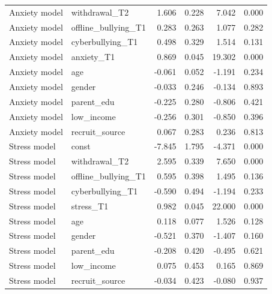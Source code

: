\begin{table}
\begin{tabular}{llrrrr}
Anxiety model & withdrawal_T2 & 1.606 & 0.228 & 7.042 & 0.000 \\
Anxiety model & offline_bullying_T1 & 0.283 & 0.263 & 1.077 & 0.282 \\
Anxiety model & cyberbullying_T1 & 0.498 & 0.329 & 1.514 & 0.131 \\
Anxiety model & anxiety_T1 & 0.869 & 0.045 & 19.302 & 0.000 \\
Anxiety model & age & -0.061 & 0.052 & -1.191 & 0.234 \\
Anxiety model & gender & -0.033 & 0.246 & -0.134 & 0.893 \\
Anxiety model & parent_edu & -0.225 & 0.280 & -0.806 & 0.421 \\
Anxiety model & low_income & -0.256 & 0.301 & -0.850 & 0.396 \\
Anxiety model & recruit_source & 0.067 & 0.283 & 0.236 & 0.813 \\
Stress model & const & -7.845 & 1.795 & -4.371 & 0.000 \\
Stress model & withdrawal_T2 & 2.595 & 0.339 & 7.650 & 0.000 \\
Stress model & offline_bullying_T1 & 0.595 & 0.398 & 1.495 & 0.136 \\
Stress model & cyberbullying_T1 & -0.590 & 0.494 & -1.194 & 0.233 \\
Stress model & stress_T1 & 0.982 & 0.045 & 22.000 & 0.000 \\
Stress model & age & 0.118 & 0.077 & 1.526 & 0.128 \\
Stress model & gender & -0.521 & 0.370 & -1.407 & 0.160 \\
Stress model & parent_edu & -0.208 & 0.420 & -0.495 & 0.621 \\
Stress model & low_income & 0.075 & 0.453 & 0.165 & 0.869 \\
Stress model & recruit_source & -0.034 & 0.423 & -0.080 & 0.937 \\
\bottomrule
\end{tabular}
\end{table}
